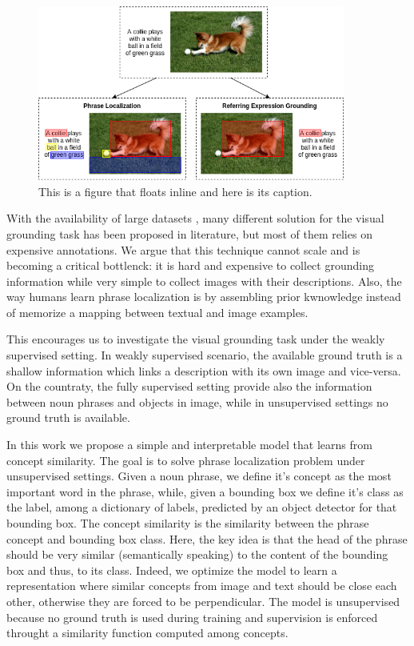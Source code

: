 \begin{figure}
    \centering
    \includegraphics[width=0.9\textwidth]{figures/dog-playing-with-ball.png}
    \caption[Short figure name.]{This is a figure that floats inline and here is its caption. 
    \label{fig:dog-playing-with-ball}}
\end{figure}

With the availability of large datasets ,
many different solution for the visual grounding task has been
proposed in literature, but most of them relies on expensive
annotations. We argue that this technique cannot scale and is becoming
a critical bottlenck: it is hard and expensive to collect grounding
information while very simple to collect images with their
descriptions. Also, the way humans learn phrase localization is by
assembling prior kwnowledge instead of memorize a mapping between
textual and image examples.

This encourages us to investigate the visual grounding task under the
weakly supervised setting. In weakly supervised scenario, the
available ground truth is a shallow information which links a
description with its own image and vice-versa. On the countraty, the
fully supervised setting provide also the information between noun
phrases and objects in image, while in unsupervised settings no ground
truth is available.

In this work we propose a simple and interpretable model that learns
from concept similarity. The goal is to solve phrase localization
problem under unsupervised settings. Given a noun phrase,
we define it's concept as the most important word in the phrase,
while, given a bounding box we define it's class as the label, among a
dictionary of labels, predicted by an object detector for that
bounding box. The concept similarity is the similarity between the
phrase concept and bounding box class. Here, the key idea is that the
head of the phrase should be very similar (semantically speaking) to
the content of the bounding box and thus, to its class. Indeed, we
optimize the model to learn a representation where similar concepts
from image and text should be close each other, otherwise they are
forced to be perpendicular. The model is unsupervised because no
ground truth is used during training and supervision is enforced
throught a similarity function computed among concepts.

